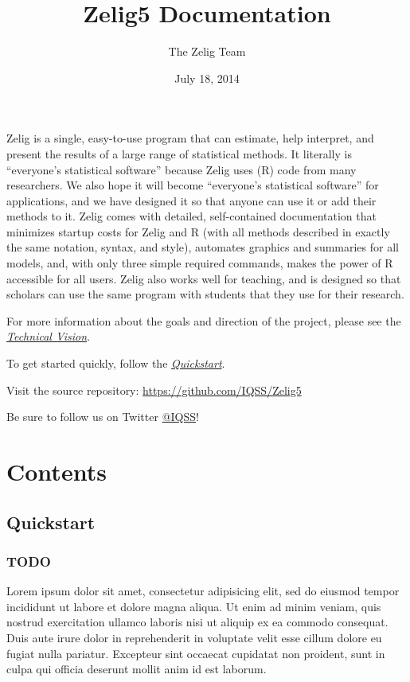 \documentclass[letterpaper,10pt,english]{sphinxmanual}
\title{Zelig5 Documentation}
\date{July 18, 2014}
\author{The Zelig Team}
\begin{document}
\maketitle
\tableofcontents
{}\label{index::doc}

\label{index:about}
Zelig is a single, easy-to-use program that can estimate, help interpret, and present the results of a large range of statistical methods. It literally is ``everyone's statistical software'' because Zelig uses (R) code from many researchers. We also hope it will become ``everyone's statistical software'' for applications, and we have designed it so that anyone can use it or add their methods to it. Zelig comes with detailed, self-contained documentation that minimizes startup costs for Zelig and R (with all methods described in exactly the same notation, syntax, and style), automates graphics and summaries for all models, and, with only three simple required commands, makes the power of R accessible for all users. Zelig also works well for teaching, and is designed so that scholars can use the same program with students that they use for their research.

For more information about the goals and direction of the project, please
see the {\hyperref[index:technicalvision]{\emph{Technical Vision}}}.

To get started quickly, follow the {\hyperref[docs/quickstart:quickstart]{\emph{Quickstart}}}.

Visit the source repository: \href{https://github.com/IQSS/Zelig5}{https://github.com/IQSS/Zelig5}

Be sure to follow us on Twitter \href{https://twitter.com/IQSS}{@IQSS}!


\chapter{Contents}
\label{index:welcome-to-zelig}\label{index:contents}

\section{Quickstart}
\label{docs/quickstart::doc}\label{docs/quickstart:quickstart}\label{docs/quickstart:id1}

\subsection{TODO}
\label{docs/quickstart:todo}
Lorem ipsum dolor sit amet, consectetur adipisicing elit, sed do eiusmod tempor incididunt ut labore et dolore magna aliqua. Ut enim ad minim veniam, quis nostrud exercitation ullamco laboris nisi ut aliquip ex ea commodo consequat. Duis aute irure dolor in reprehenderit in voluptate velit esse cillum dolore eu fugiat nulla pariatur. Excepteur sint occaecat cupidatat non proident, sunt in culpa qui officia deserunt mollit anim id est laborum.
\end{document}
